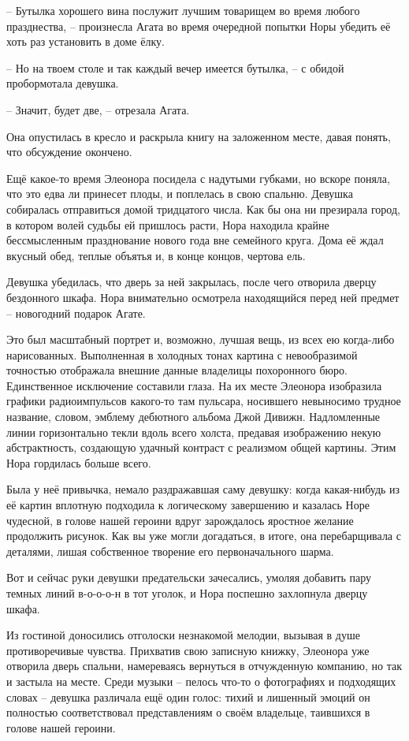 \documentclass[
  a5paperpaper,
  DIV=11,
  numbers=noendperiod]{scrreprt}
\begin{document}
-- Бутылка хорошего вина послужит лучшим товарищем во время любого
празднества, -- произнесла Агата во время очередной попытки Норы убедить
её хоть раз установить в доме ёлку.

-- Но на твоем столе и так каждый вечер имеется бутылка, -- с обидой
пробормотала девушка.

-- Значит, будет две, -- отрезала Агата.

Она опустилась в кресло и раскрыла книгу на заложенном месте, давая
понять, что обсуждение окончено.

Ещё какое-то время Элеонора посидела с надутыми губками, но вскоре
поняла, что это едва ли принесет плоды, и поплелась в свою спальню.
Девушка собиралась отправиться домой тридцатого числа. Как бы она ни
презирала город, в котором волей судьбы ей пришлось расти, Нора находила
крайне бессмысленным празднование нового года вне семейного круга. Дома
её ждал вкусный обед, теплые объятья и, в конце концов, чертова ель.

Девушка убедилась, что дверь за ней закрылась, после чего отворила
дверцу бездонного шкафа. Нора внимательно осмотрела находящийся перед
ней предмет -- новогодний подарок Агате.

Это был масштабный портрет и, возможно, лучшая вещь, из всех ею
когда-либо нарисованных. Выполненная в холодных тонах картина с
невообразимой точностью отображала внешние данные владелицы похоронного
бюро. Единственное исключение составили глаза. На их месте Элеонора
изобразила графики радиоимпульсов какого-то там пульсара, носившего
невыносимо трудное название, словом, эмблему дебютного альбома Джой
Дивижн. Надломленные линии горизонтально текли вдоль всего холста,
предавая изображению некую абстрактность, создающую удачный контраст с
реализмом общей картины. Этим Нора гордилась больше всего.

Была у неё привычка, немало раздражавшая саму девушку: когда
какая-нибудь из её картин вплотную подходила к логическому завершению и
казалась Норе чудесной, в голове нашей героини вдруг зарождалось
яростное желание продолжить рисунок. Как вы уже могли догадаться, в
итоге, она перебарщивала с деталями, лишая собственное творение его
первоначального шарма.

Вот и сейчас руки девушки предательски зачесались, умоляя добавить пару
темных линий в-о-о-о-н в тот уголок, и Нора поспешно захлопнула дверцу
шкафа.

Из гостиной доносились отголоски незнакомой мелодии, вызывая в душе
противоречивые чувства. Прихватив свою записную книжку, Элеонора уже
отворила дверь спальни, намереваясь вернуться в отчужденную компанию, но
так и застыла на месте. Среди музыки -- пелось что-то о фотографиях и
подходящих словах -- девушка различала ещё один голос: тихий и лишенный
эмоций он полностью соответствовал представлениям о своём владельце,
таившихся в голове нашей героини.
\end{document}
